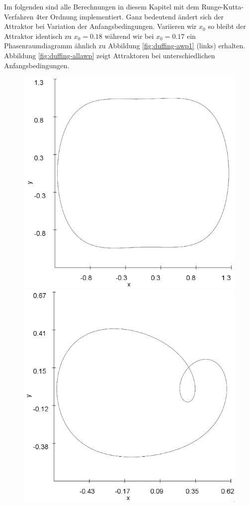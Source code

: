 \documentclass[12pt,a4paper]{article}
\begin{document}
Im folgenden sind alle Berechnungen in diesem Kapitel mit dem Runge-Kutta-Verfahren 4ter Ordnung implementiert.
Ganz bedeutend ändert sich der Attraktor bei Variation der Anfangsbedingungen. Variieren wir $x_0$ so bleibt der Attraktor identisch zu $x_0=0.18$ während wir bei $x_0=0.17$ ein Phasenraumdiagramm ähnlich zu Abbildung \ref{fig:duffing-awp1} (links) erhalten.
\newline
Abbildung \ref{fig:duffing-allawp} zeigt Attraktoren bei unterschiedlichen Anfangsbedingungen.
\begin{figure}[!htbp]
\includegraphics[scale=0.4]{duffing-awp2-500k-nach-500k-h0,01-runge}
\includegraphics[scale=0.4]{duffing-awp3-500k-nach-500k-h0,01-runge}

\end{figure}
\end{document}
